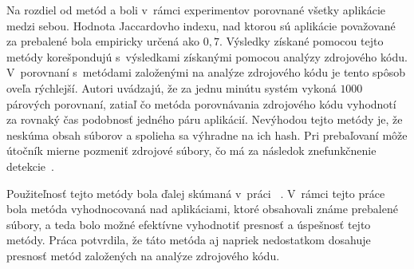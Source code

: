 Na rozdiel od metód  a  boli v~rámci experimentov porovnané všetky aplikácie medzi sebou. Hodnota Jaccardovho indexu, nad ktorou sú aplikácie považované za prebalené bola empiricky určená ako $0,7$.
Výsledky získané pomocou tejto metódy korešpondujú s~výsledkami získanými pomocou analýzy zdrojového kódu. V~porovnaní s~metódami založenými na analýze zdrojového kódu je tento spôsob oveľa rýchlejší. Autori uvádzajú, že za jednu minútu systém vykoná $1000$ párových porovnaní, zatiaľ čo metóda porovnávania zdrojového kódu vyhodnotí za rovnaký čas podobnosť jedného páru aplikácií.
Nevýhodou tejto metódy je, že neskúma obsah súborov a spolieha sa výhradne na ich hash. Pri prebaľovaní môže útočník mierne pozmeniť zdrojové súbory, čo má za následok znefunkčnenie detekcie~\cite{Zhauniarovich2014}. 

Použiteľnosť tejto metódy bola ďalej skúmaná v~práci ~\cite{Gadyatskaya2016}. V~rámci tejto práce bola metóda vyhodnocovaná nad aplikáciami, ktoré obsahovali známe prebalené súbory, a teda bolo možné efektívne vyhodnotiť presnosť a úspešnosť tejto metódy. Práca potvrdila, že táto metóda aj napriek nedostatkom dosahuje presnosť metód založených na analýze zdrojového kódu.